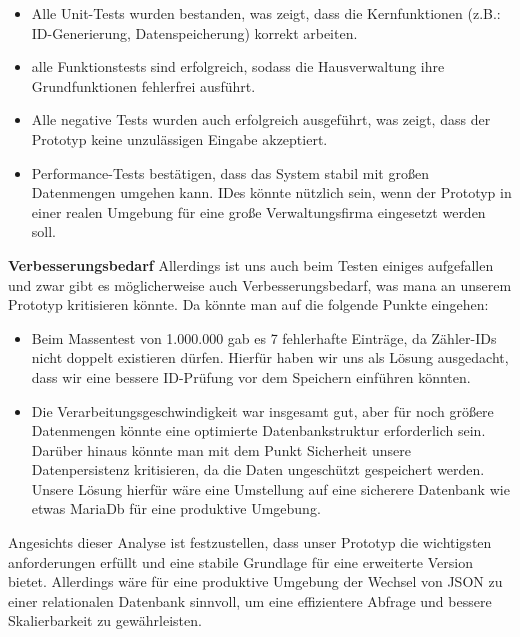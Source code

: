 \begin{itemize}
    \item Alle Unit-Tests wurden bestanden, was zeigt, dass die Kernfunktionen (z.B.: ID-Generierung, Datenspeicherung) korrekt arbeiten.
    \item alle Funktionstests sind erfolgreich, sodass die Hausverwaltung ihre Grundfunktionen fehlerfrei ausführt.
    \item Alle negative Tests wurden auch erfolgreich ausgeführt, was zeigt, dass der Prototyp keine unzulässigen Eingabe akzeptiert.
    \item Performance-Tests bestätigen, dass das System stabil mit großen Datenmengen umgehen kann.
    IDes könnte nützlich sein, wenn der Prototyp in einer realen Umgebung für eine große Verwaltungsfirma eingesetzt werden soll.
\end{itemize}

\textbf{Verbesserungsbedarf}
Allerdings ist uns auch beim Testen einiges aufgefallen und zwar gibt es möglicherweise auch Verbesserungsbedarf, was mana an unserem Prototyp kritisieren könnte.
Da könnte man auf die folgende Punkte eingehen:
\begin{itemize}
    \item Beim Massentest von 1.000.000 gab es 7 fehlerhafte Einträge, da Zähler-IDs nicht doppelt existieren dürfen.
    Hierfür haben wir uns als Lösung ausgedacht, dass wir eine bessere ID-Prüfung vor dem Speichern einführen könnten.
    \item Die Verarbeitungsgeschwindigkeit war insgesamt gut, aber für noch größere Datenmengen könnte eine optimierte Datenbankstruktur erforderlich sein.
    Darüber hinaus könnte man mit dem Punkt Sicherheit unsere Datenpersistenz kritisieren, da die Daten ungeschützt gespeichert werden.
    Unsere Lösung hierfür wäre eine Umstellung auf eine sicherere Datenbank wie etwas MariaDb für eine produktive Umgebung.
\end{itemize}

Angesichts dieser Analyse ist festzustellen, dass unser Prototyp die wichtigsten anforderungen erfüllt und eine stabile Grundlage für eine erweiterte Version bietet.
Allerdings wäre für eine produktive Umgebung der Wechsel von JSON zu einer relationalen Datenbank sinnvoll, um eine effizientere Abfrage und bessere Skalierbarkeit zu gewährleisten.
